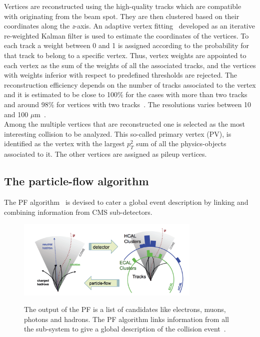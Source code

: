 Vertices are reconstructed using the high-quality tracks which are
compatible with originating from the beam spot. They are then clustered
based on their coordinates along the \emph{z}-axis. An adaptive vertex
fitting~\cite{Waltenberger_2007} developed as an iterative re-weighted Kalman filter
is used to estimate the coordinates of the vertices. To each track a
weight between 0 and 1 is assigned according to the probability for that track to
belong to a specific vertex. Thus, vertex weights are appointed to each
vertex as the sum of the weights of all the
associated tracks, and the vertices with weights inferior with respect
to predefined
thresholds are rejected. The reconstruction efficiency depends on the
number of tracks associated to the vertex and it is estimated to
be close to 100\% for the cases with more than two tracks and around
98\% for vertices with two tracks~\cite{CMS:particleflow}. The
resolutions varies between 10 and 100
$\mu$m~\cite{CMS:particleflow}.\\
Among the multiple vertices that are reconstructed one is selected as
the most interesting collision to be analyzed. This so-called primary vertex (PV), is identified as the vertex with the largest
$p^2_T$ sum of all the physics-objects associated to it. The other vertices are assigned as pileup
vertices.

\subsection{The particle-flow algorithm}\label{sec:PF}

The PF algorithm~\cite{CMS:particleflow} is devised to cater a global event
description by linking and combining information from CMS
sub-detectors. 
\begin{figure}[h]
\centering
\includegraphics[width=0.78\textwidth]{Figures/c2/pfscheme}\\
\caption{The output of the PF is a list of candidates like
  electrons, muons, photons and hadrons. The PF algorithm links
  information from all the sub-system to give a global description of
  the collision event~\cite{Petrucciani:2650974}.}
\label{fig:pfscheme}
\end{figure} 

